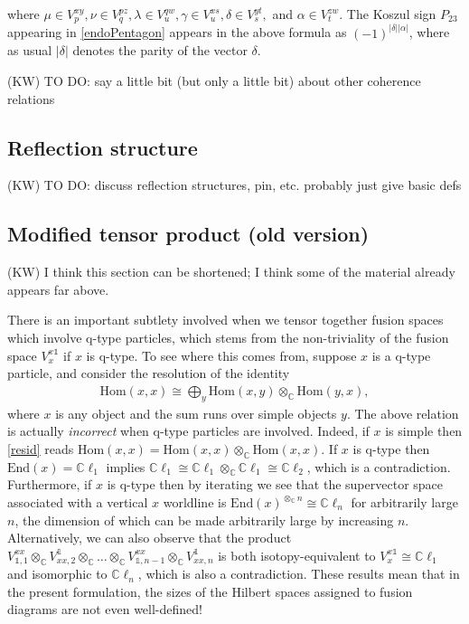 \documentclass[12pt,a4paper]{article}
\newcommand{\tp}{\otimes}
\newcommand{\unit}{\mathds{1}}
\newcommand{\cc}{\mathbb{C}}
\newcommand{\Hom}{\text{Hom}}
\newcommand{\End}{\text{End}}
\newcommand{\cl}{\mathbb{C}\ell}
\newcommand{\kw}[1]{{\color{kwcolor}\footnotesize{(KW) #1}}}
\begin{document}
where $\mu\in V^{xy}_p,\nu\in V^{pz}_q,\lambda\in V^{qw}_u,\gamma\in V^{xs}_u,\delta\in V^{yt}_s,$ and $\alpha\in V^{zw}_t$. 
The Koszul sign $P_{23}$ appearing in \eqref{endoPentagon} appears in the above formula as $(-1)^{|\delta||\alpha|}$, where as usual $|\delta|$ denotes the parity 
of the vector $\delta$. 


\kw{TO DO: say a little bit (but only a little bit) about other coherence relations}





\subsection{Reflection structure} \label{reflection_ss}

\kw{TO DO: discuss reflection structures, pin, etc.
probably just give basic defs}



\subsection{Modified tensor product (old version)}

\kw{I think this section can be shortened; I think some of the material already appears far above.}

There is an important subtlety involved when we tensor together fusion spaces which involve q-type particles, which stems from the non-triviality of the fusion space $V^{x\unit}_x$ if $x$ is q-type.
To see where this comes from, suppose $x$ is a q-type particle, and consider the resolution of the identity 
\begin{align} \label{resid}
\Hom(x,x) \cong \bigoplus_y \Hom(x,y) \tp_\cc \Hom(y,x),
\end{align}
where $x$ is any object and the sum runs over simple objects $y$. 
The above relation is actually {\it incorrect} when q-type particles are involved. 
Indeed, if $x$ is simple then \eqref{resid} reads $\Hom(x,x) = \Hom(x,x) \tp_\cc \Hom(x,x).$ 
If $x$ is q-type then $\End(x) = \cl_1$ implies $\cl_1 \cong \cl_1\tp_\cc \cl_1 \cong \cl_2$, which is a contradiction. 
Furthermore, if $x$ is q-type then by iterating we see that the supervector space associated with a vertical $x$ worldline is $\End(x)^{\tp_{\cc} n} \cong \cl_n$ for arbitrarily large $n$, the dimension of which can be made arbitrarily large by increasing $n$. 
Alternatively, we can also observe that the product $V_{\unit,1}^{xx} \tp_\cc V^\unit_{xx,2} \tp_\cc \dots \tp_\cc V_{\unit,n-1}^{xx} \tp_\cc V^\unit_{xx,n}$ is both isotopy-equivalent to $V^{x\unit}_x \cong \cl_1$ and isomorphic to $\cl_n$, which is also a contradiction. 
These results mean that in the present formulation, the sizes of the Hilbert spaces assigned to fusion diagrams are not even well-defined! 
\end{document}
